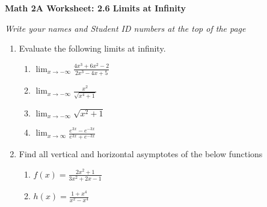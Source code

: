 \documentclass[12pt,fleqn]{article}
\begin{document}
\begin{center}
	\textbf{Math 2A Worksheet: 2.6 Limits at Infinity}
\end{center}

\emph{Write your names and Student ID numbers at the top of the page}


\begin{enumerate}
\item Evaluate the following limits at infinity.
\begin{enumerate}
\item $\displaystyle\lim_{x\to-\infty}\frac{4x^3+6x^2-2}{2x^3-4x+5}$\vfill

\item $\displaystyle\lim_{x\to-\infty}\frac{x^2}{\sqrt{x^4+1}}$\vfill

\item $\displaystyle\lim_{x\to-\infty}\sqrt{x^2+1}$\vfill

\item $\displaystyle\lim_{x\to\infty}\frac{e^{3x}-e^{-3x}}{e^{3x}+e^{-3x}}$\vfill
\end{enumerate}

\newpage

\item Find all vertical and horizontal asymptotes of the below functions
\begin{enumerate}
\item $f(x)=\displaystyle\frac{2x^2+1}{3x^2+2x-1}$\vfill

\item $h(x)=\displaystyle\frac{1+x^4}{x^2-x^4}$
\end{enumerate}

\vfill

\end{enumerate}
\end{document}
